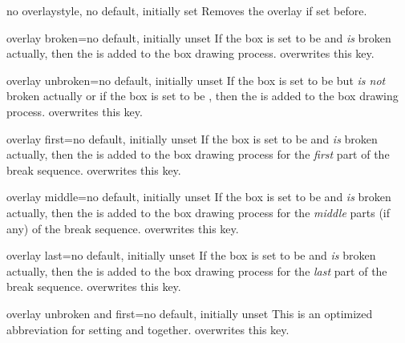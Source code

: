 \clearpage
\begin{docTcbKey}{no overlay}{}{style, no default, initially set}
  Removes the overlay if set before.
\end{docTcbKey}

\begin{docTcbKey}{overlay broken}{=}{no default, initially unset}
  If the box is set to be  and \emph{is} broken actually,
  then the  is added to the box drawing process.
   overwrites this key.
\end{docTcbKey}

\begin{docTcbKey}{overlay unbroken}{=}{no default, initially unset}
  If the box is set to be  but \emph{is not} broken actually
  or if the box is set to be ,
  then the  is added to the box drawing process.
   overwrites this key.
\end{docTcbKey}

\begin{docTcbKey}{overlay first}{=}{no default, initially unset}
  If the box is set to be  and \emph{is} broken actually,
  then the  is added to the box drawing process for
  the \emph{first} part of the break sequence.
   overwrites this key.
\end{docTcbKey}

\begin{docTcbKey}{overlay middle}{=}{no default, initially unset}
  If the box is set to be  and \emph{is} broken actually,
  then the  is added to the box drawing process for
  the \emph{middle} parts (if any) of the break sequence.
   overwrites this key.
\end{docTcbKey}

\begin{docTcbKey}{overlay last}{=}{no default, initially unset}
  If the box is set to be  and \emph{is} broken actually,
  then the  is added to the box drawing process for
  the \emph{last} part of the break sequence.
   overwrites this key.
\end{docTcbKey}

\begin{docTcbKey}{overlay unbroken and first}{=}{no default, initially unset}
  This is an optimized abbreviation for setting
   and
   together.
   overwrites this key.
\end{docTcbKey}

